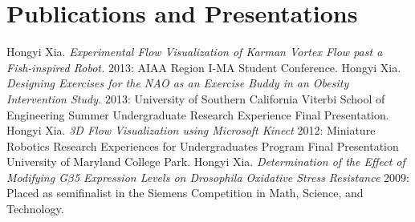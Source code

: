 \documentclass[10pt,letterpaper,sans]{moderncv}        %
\begin{document}
\section{Publications and Presentations}
% 
\begin{thebibliography}{1}
 Hongyi Xia. {\em Experimental Flow Visualization of Karman Vortex Flow past a Fish-inspired Robot.}  2013: AIAA Region I-MA Student Conference.
 Hongyi Xia. {\em Designing Exercises for the NAO as an Exercise Buddy in an Obesity Intervention Study.} 2013: University of Southern California Viterbi School of Engineering Summer Undergraduate Research Experience Final Presentation.
  Hongyi Xia. {\em 3D Flow Visualization using Microsoft Kinect} 2012:
Miniature Robotics Research Experiences for Undergraduates Program Final Presentation University of Maryland College Park.
 Hongyi Xia. {\em Determination of the Effect of Modifying G$\beta$5 Expression Levels on Drosophila Oxidative Stress Resistance} 2009: Placed as semifinalist in the Siemens Competition in Math, Science, and Technology.
\end{thebibliography}



\end{document}
